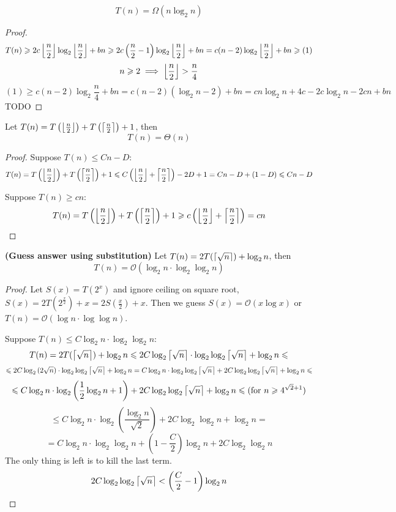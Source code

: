 \begin{example}
    \[ T(n) = \Omega(n \log_2 n) \]
\end{example}
\begin{proof}
    \[ T(n) \geqslant 2c \left\lfloor\frac n 2\right\rfloor \log_2 \left\lfloor\frac n 2\right\rfloor + bn \geqslant 2c \left(\frac n 2 - 1 \right) \log_2 \left\lfloor\frac n 2\right\rfloor + bn = c (n - 2) \log_2 \left\lfloor\frac n 2\right\rfloor + bn \geqslant (1) \]
    \[ n \geqslant 2 \implies \left\lfloor\frac n 2\right\rfloor > \frac n 4 \]
    \[ (1) \ge c (n - 2) \log_2 \frac n 4 + bn = c (n - 2) (\log_2 n - 2) + bn = c n \log_2 n + 4c - 2c \log_2 n - 2cn + bn \]
    TODO
\end{proof}

\begin{example}
    Let $T(n) = T\left(\left\lfloor\frac n 2\right\rfloor\right) + T\left(\left\lceil\frac n 2\right\rceil\right) + 1$, then
    \[ T(n) = \Theta(n) \]
\end{example}
\begin{proof}
    Suppose $T(n) \le Cn - D$: \\
    \[ T(n) = T\left(\left\lfloor\frac n 2\right\rfloor\right) + T\left(\left\lceil\frac n 2\right\rceil\right) + 1 \leqslant C \left(\left\lfloor\frac n 2\right\rfloor + \left\lceil\frac n 2\right\rceil \right) - 2D + 1 = Cn - D + (1 - D) \leqslant Cn - D \]

    Suppose $T(n) \ge cn$: \\
    \[ T(n) = T\left(\left\lfloor\frac n 2\right\rfloor\right) + T\left(\left\lceil\frac n 2\right\rceil\right) + 1 \geqslant c \left(\left\lfloor\frac n 2\right\rfloor + \left\lceil\frac n 2\right\rceil \right) = cn \]
\end{proof}

\begin{example}\textbf{(Guess answer using substitution)} Let $ T(n) = 2 T(\left\lceil\sqrt n\right\rceil) + \log_2 n $, then
    \[ T(n) = \mathcal{O}(\log_2 n \cdot \log_2 \log_2 n) \]
\end{example}
\begin{proof}
    Let $S(x) = T(2 ^ x)$ and ignore ceiling on square root, $S(x) = 2 T(2 ^ {\frac x 2}) + x = 2S(\frac x 2) + x $.
    Then we guess $S(x) = \mathcal{O}(x \log x)$ or $T(n) = \mathcal{O}(\log n \cdot \log \log n)$.

    Suppose $ T(n) \le C \log_2 n \cdot \log_2 \log_2 n $:
    \[
        T(n) =
        2 T(\left\lceil\sqrt n\right\rceil) + \log_2 n \leqslant
        2C \log_2{\left\lceil\sqrt n\right\rceil} \cdot \log_2 \log_2 {\left\lceil\sqrt n\right\rceil} + \log_2 n \leqslant
    \]\[
        \leqslant 2C \log_2{(2 \sqrt n)} \cdot \log_2 \log_2 {\left\lceil\sqrt n\right\rceil} + \log_2 n =
        C \log_2{n} \cdot \log_2 \log_2 {\left\lceil\sqrt n\right\rceil} + 2C\log_2 \log_2 {\left\lceil\sqrt n\right\rceil} + \log_2 n \leqslant
    \]\[
        \leqslant C \log_2{n} \cdot \log_2 \left(\frac 1 2 \log_2 {n} + 1\right) + 2C\log_2 \log_2 {\left\lceil\sqrt n\right\rceil} + \log_2 n \leqslant (\text{for } n \geqslant 4^{\sqrt{2} + 1})
    \]\[
        \le C \log_2{n} \cdot \log_2 \left(\frac{\log_2 {n}}{\sqrt{2}} \right) + 2C\log_2 \log_2 n + \log_2 n =
    \]\[
        = C \log_2{n} \cdot \log_2 \log_2 {n} + \left( 1 - \frac C 2 \right) \log_2{n} + 2C\log_2 \log_2 n
    \]
    The only thing is left is to kill the last term.
    \[ 2C\log_2 \log_2 {\left\lceil\sqrt n\right\rceil} < \left(\frac C 2 - 1 \right) \log_2{n} \]
\end{proof}

